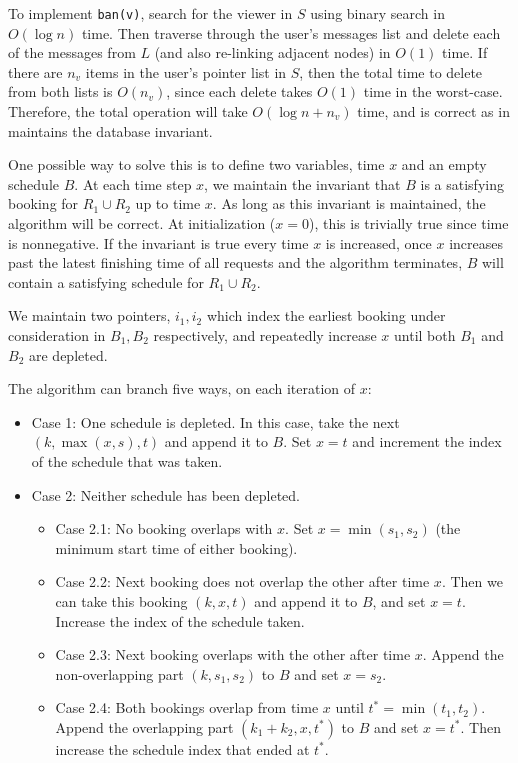 \documentclass[12pt,twoside]{article}
\begin{document}
\begin{problems}
To implement \verb|ban(v)|, search for the viewer in \(S\) using binary search in \(O(\log n)\) time. Then traverse through the user's messages list and delete each of the messages from \(L\) (and also re-linking adjacent nodes) in \(O(1)\) time. If there are \(n_v\) items in the user's pointer list in \(S\), then the total time to delete from both lists is \(O(n_v)\), since each delete takes \(O(1)\) time in the worst-case. Therefore, the total operation will take \(O(\log n + n_v)\) time, and is correct as in maintains the database invariant.

\newpage
\problem  %

\begin{problemparts}
\problempart %
One possible way to solve this is to define two variables, time \(x\) and an empty schedule \(B\). At each time step \(x\), we maintain the invariant that \(B\) is a satisfying booking for \(R_1 \cup R_2\) up to time \(x\). As long as this invariant is maintained, the algorithm will be correct. At initialization (\(x=0\)), this is trivially true since time is nonnegative. If the invariant is true every time \(x\) is increased, once \(x\) increases past the latest finishing time of all requests and the algorithm terminates, \(B\) will contain a satisfying schedule for \(R_1 \cup R_2\).

We maintain two pointers, \(i_1, i_2\) which index the earliest booking under consideration in \(B_1, B_2\) respectively, and repeatedly increase \(x\) until both \(B_1\) and \(B_2\) are depleted.

The algorithm can branch five ways, on each iteration of \(x\):
\begin{itemize}
    \item Case 1: One schedule is depleted. In this case, take the next \((k, \max(x, s), t)\) and append it to \(B\). Set \(x=t\) and increment the index of the schedule that was taken.
    \item Case 2: Neither schedule has been depleted.
        \begin{itemize}
            \item Case 2.1: No booking overlaps with \(x\). Set \(x=\min(s_1, s_2)\) (the minimum start time of either booking). 
            \item Case 2.2: Next booking does not overlap the other after time \(x\). Then we can take this booking \((k, x, t)\) and append it to \(B\), and set \(x=t\). Increase the index of the schedule taken.
            \item Case 2.3: Next booking overlaps with the other after time \(x\). Append the non-overlapping part \((k, s_1, s_2)\) to \(B\) and set \(x=s_2\).
            \item Case 2.4: Both bookings overlap from time \(x\) until \(t^*=\min(t_1, t_2)\). Append the overlapping part \((k_1 + k_2, x, t^*)\) to \(B\) and set \(x=t^*\). Then increase the schedule index that ended at \(t^*\).
        \end{itemize}
\end{itemize}


\end{problemparts}
\end{problems}
\end{document}
